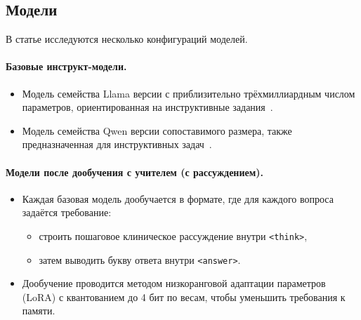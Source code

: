 \subsection{Модели}

В статье исследуются несколько конфигураций моделей.

\paragraph{Базовые инструкт-модели.}
    \begin{itemize}
        \item Модель семейства Llama версии с приблизительно трёхмиллиардным 
        числом параметров, ориентированная на инструктивные 
        задания~\cite{llama3techreport}.

        \item Модель семейства Qwen версии сопоставимого размера, 
        также предназначенная для инструктивных задач~\cite{qwen2.5}.
    \end{itemize}

\paragraph{Модели после дообучения с учителем (с рассуждением).}
    \begin{itemize}
        \item Каждая базовая модель дообучается в формате, где для 
        каждого вопроса задаётся требование:
        \begin{itemize}
            \item строить пошаговое клиническое рассуждение внутри \verb|<think>|,
            \item затем выводить букву ответа внутри \verb|<answer>|.
        \end{itemize}
        \item Дообучение проводится методом низкоранговой адаптации 
        параметров (LoRA) с квантованием до 4 бит по весам, чтобы уменьшить 
        требования к памяти.
    \end{itemize}

